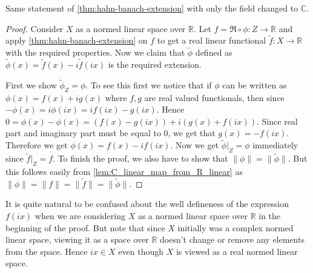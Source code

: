 \begin{theorem}
  Same statement of \autoref{thm:hahn-banach-extension} with only the
  field changed to $\mathbb{C}$.
\end{theorem}
\begin{proof}
  Consider $X$ as a normed linear space over $\mathbb{R}$. Let $f =
  \Re \circ \phi: Z \to \mathbb{R}$ and apply
  \autoref{thm:hahn-banach-extension} on $f$ to get a real linear
  functional $\tilde{f}: X \to \mathbb{R}$ with the required
  properties. Now we claim that $\tilde{ \phi}$ defined as $\tilde{
  \phi}(x) = \tilde{f}(x) - i \tilde{f}(ix)$ is the required extension.

  First we show $\tilde{ \phi}_Z = \phi$. To see this first we notice
  that if $ \phi$ can be written as  $\phi(x) = f( x) + ig(x)$ where
  $ f, g$ are real valued functionals, then since $-\phi(x) =
  i\phi(ix) = if(ix) - g(ix)$. Hence $0 = \phi(x) - \phi(x) = (f(x) -
  g(ix)) + i(g(x) + f(ix))$. Since real part and imaginary part must
  be equal to 0, we get that $g(x) = -f(ix)$. Therefore we get
  $\phi(x) = f(x) - if(ix)$.
  Now we get $\tilde{\phi}|_Z = \phi$ immediately since $ \tilde{f}|_Z = f$.
  To finish the proof, we also have to show that $\|\phi\| =
  \|\tilde{\phi}\|$. But this follows easily from
  \autoref{lem:C_linear_map_from_R_linear} as $\|\phi\| = \|f\| =
  \|\tilde{f}\| = \|\tilde{\phi}\|$.
\end{proof}

\begin{remark}
  It is quite natural to be confused about the well defineness of the
  expression $f(ix)$ when we are considering $X$ as a normed linear
  space over $ \mathbb{R}$ in the beginning of the proof. But note
  that since $X$ initially was a complex normed linear space, viewing
  it as a space over $\mathbb{R}$ doesn't change or remove any
  elements from the space. Hence $ix \in X$ even though $X$ is viewed
  as a real normed linear space.
\end{remark}
